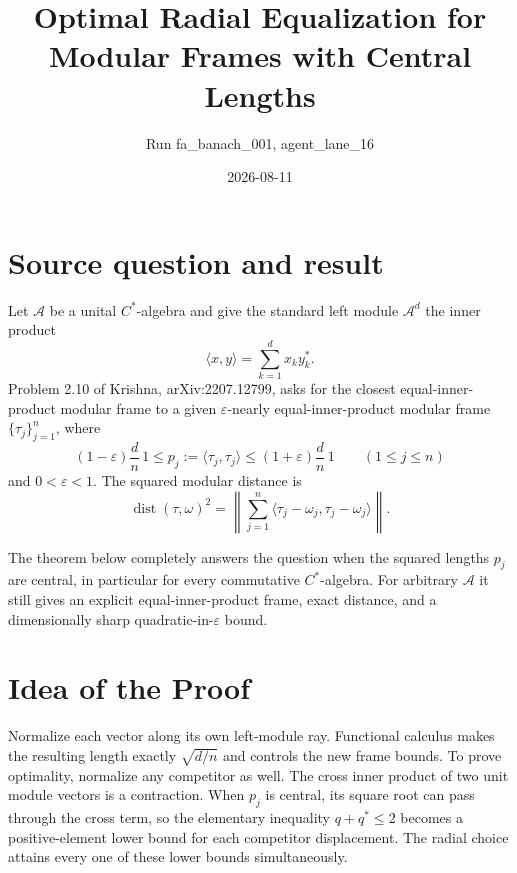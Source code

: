 \documentclass[11pt]{article}
\title{Optimal Radial Equalization for Modular Frames with Central Lengths}
\author{Run fa\_banach\_001, agent\_lane\_16}
\date{2026-08-11}
\newcommand{\A}{\mathcal A}
\newcommand{\dist}{\operatorname{dist}}
\begin{document}
\maketitle

\section*{Source question and result}

Let $\A$ be a unital $C^*$-algebra and give the standard left module
$\A^d$ the inner product
\[
 \langle x,y\rangle=\sum_{k=1}^d x_k y_k^*.
\]
Problem 2.10 of Krishna, arXiv:2207.12799, asks for the closest
equal-inner-product modular frame to a given $\varepsilon$-nearly
equal-inner-product modular frame $\{\tau_j\}_{j=1}^n$, where
\begin{equation}\label{eq:near}
 (1-\varepsilon)\frac dn\,1
 \le p_j:=\langle\tau_j,\tau_j\rangle
 \le(1+\varepsilon)\frac dn\,1
 \qquad(1\le j\le n)
\end{equation}
and $0<\varepsilon<1$.  The squared modular distance is
\[
 \dist(\tau,\omega)^2
 =\left\|\sum_{j=1}^n
 \langle\tau_j-\omega_j,\tau_j-\omega_j\rangle\right\|.
\]

The theorem below completely answers the question when the squared lengths
$p_j$ are central, in particular for every commutative $C^*$-algebra.  For
arbitrary $\A$ it still gives an explicit equal-inner-product frame, exact
distance, and a dimensionally sharp quadratic-in-$\varepsilon$ bound.

\section*{Idea of the Proof}

Normalize each vector along its own left-module ray.  Functional calculus
makes the resulting length exactly $\sqrt{d/n}$ and controls the new frame
bounds.  To prove optimality, normalize any competitor as well.  The cross
inner product of two unit module vectors is a contraction.  When $p_j$ is
central, its square root can pass through the cross term, so the elementary
inequality $q+q^*\le2$ becomes a positive-element lower bound for each
competitor displacement.  The radial choice attains every one of these
lower bounds simultaneously.
\end{document}
